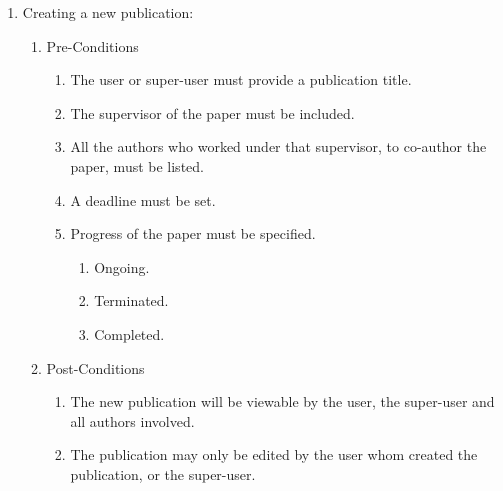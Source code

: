 \documentclass{article} %
\begin{document}
	\noindent 
	
	\begin{enumerate}
		\item  Creating a new publication:
		
		\begin{enumerate}
			\item  Pre-Conditions
			
			\begin{enumerate}
				\item  The user or super-user must provide a publication title.
				
				\item  The supervisor of the paper must be included.
				
				\item  All the authors who worked under that supervisor, to co-author the paper, must be listed.
				
				\item  A deadline must be set.
				
				\item  Progress of the paper must be specified.
				
				\begin{enumerate}
					\item  Ongoing.
					
					\item  Terminated.
					
					\item  Completed.
				\end{enumerate}
			\end{enumerate}
			
			\item  Post-Conditions
			
			\begin{enumerate}
				\item  The new publication will be viewable by the user, the super-user and all authors involved.
				
				\item  The publication may only be edited by the user whom created the publication, or the super-user.
			\end{enumerate}
		\end{enumerate}
	\end{enumerate}
	
	\noindent  
	
\end{document}
